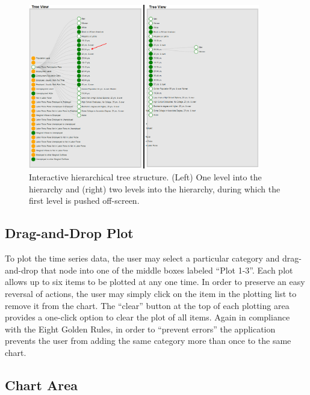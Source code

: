 \documentclass[11pt,letterpaper]{article}
\begin{document}
\begin{figure}[h]
\centering
    \includegraphics[width=0.9\textwidth]{figures/tree2.png}
    \caption{Interactive hierarchical tree structure. (Left) One level into the hierarchy and (right) two levels into the hierarchy, during which the first level is pushed off-screen.}
    \label{TreeStructure}
\end{figure}

\subsection{Drag-and-Drop Plot}

To plot the time series data, the user may select a particular category and drag-and-drop that node into one of the middle boxes labeled ``Plot 1-3''. Each plot allows up to six items to be plotted at any one time. In order to preserve an easy reversal of actions, the user may simply click on the item in the plotting list to remove it from the chart. The ``clear'' button at the top of each plotting area provides a one-click option to clear the plot of all items. Again in compliance with the Eight Golden Rules, in order to ``prevent errors'' the application prevents the user from adding the same category more than once to the same chart.

\subsection{Chart Area}
\end{document}
